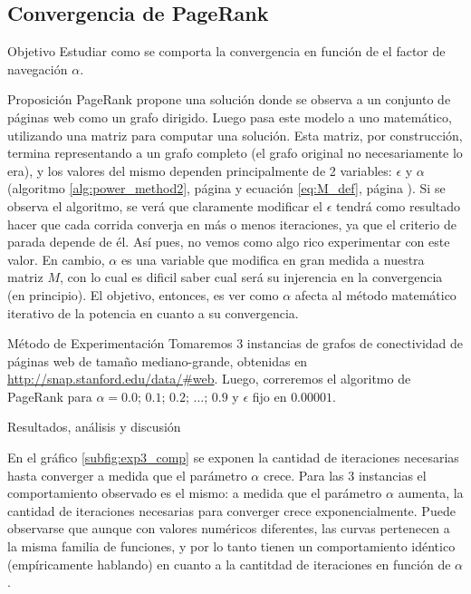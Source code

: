 \subsection{Convergencia de PageRank}
\label{subsec:exp3}
\begin{LaTeXdescription}
    \item[Objetivo] Estudiar como se comporta la convergencia en funci\'on de
        el factor de navegaci\'on $\alpha$.\\

    \item[Proposici\'on] PageRank propone una soluci\'on donde se observa a un
        conjunto de p\'aginas web como un grafo dirigido. Luego pasa este modelo
        a uno  matem\'atico, utilizando una matriz para computar una soluci\'on.
        Esta matriz, por construcci\'on, termina representando a un grafo
        completo (el grafo original no necesariamente lo era), y los valores del
        mismo dependen principalmente de 2 variables: $\epsilon$ y $\alpha$
        (algoritmo \ref{alg:power_method2}, p\'agina \pageref{alg:power_method2}
        y ecuaci\'on \ref{eq:M_def}, p\'agina \pageref{eq:M_def}). Si se observa
        el algoritmo, se ver\'a que claramente modificar el $\epsilon$ tendr\'a
        como resultado hacer que cada corrida converja en m\'as o menos
        iteraciones, ya que el criterio de parada depende de \'el. As\'i pues,
        no vemos como algo rico experimentar con este valor. En cambio, $\alpha$
        es una variable que modifica en gran medida a nuestra matriz $M$, con lo
        cual es dificil saber cual ser\'a su injerencia en la convergencia (en
        principio). El objetivo, entonces, es ver como $\alpha$ afecta al
        m\'etodo matem\'atico iterativo de la potencia en cuanto a su
        convergencia.\\

    \item[M\'etodo de Experimentaci\'on] Tomaremos 3 instancias de grafos de
        conectividad de p\'aginas web de tama\~no mediano-grande, obtenidas en
        \url{http://snap.stanford.edu/data/\#web}. Luego, correremos el
        algoritmo de PageRank para $\alpha=0.0$; $0.1$; $0.2$; $\dots$; $0.9$ y
        $\epsilon$ fijo en $0.00001$.\\

    \item[Resultados, an\'alisis y discusi\'on]
\end{LaTeXdescription}

\par En el gráfico \ref{subfig:exp3_comp} se exponen la cantidad de iteraciones
necesarias hasta converger a medida que el parámetro $\alpha$ crece. Para las 3
instancias el comportamiento observado es el mismo: a medida que el par\'ametro
$\alpha$ aumenta, la cantidad de iteraciones necesarias para converger crece
exponencialmente. Puede observarse que aunque con valores numéricos diferentes,
las curvas pertenecen a la misma familia de funciones, y por lo tanto tienen un
comportamiento id\'entico (emp\'iricamente hablando) en cuanto a la cantitdad de
iteraciones en funci\'on de $\alpha$.

